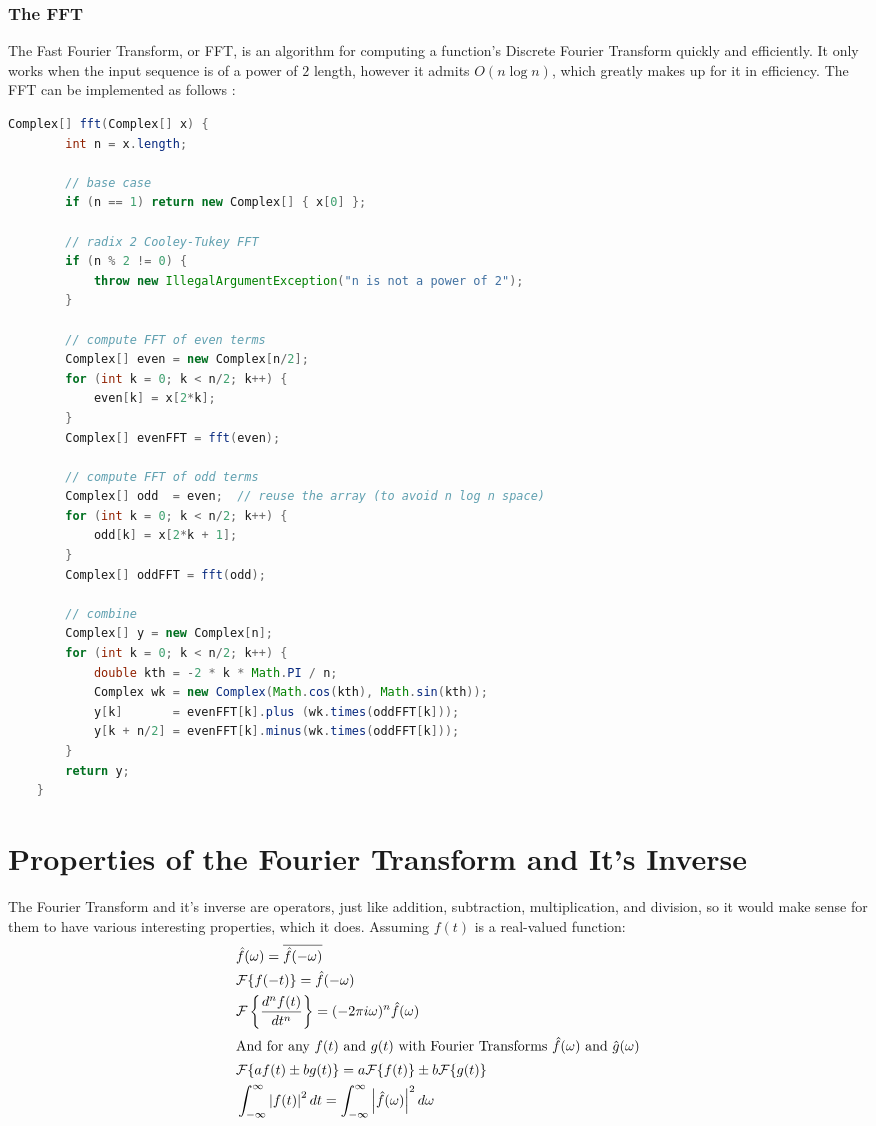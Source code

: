 \documentclass[12pt]{article}
\newcommand{\F}{\mathcal{F}}
\begin{document}
    \subsubsection{The FFT}
    The Fast Fourier Transform, or FFT, is an algorithm for computing a function's Discrete Fourier Transform quickly and efficiently. It only works when the input sequence is of a power of $2$ length, however it admits  $O(n\log n)$, which greatly makes up for it in efficiency. The FFT can be implemented as follows \cite{fft}:
    \begin{lstlisting}[language=Java, basicstyle=\small]
    Complex[] fft(Complex[] x) {
        int n = x.length;

        // base case
        if (n == 1) return new Complex[] { x[0] };

        // radix 2 Cooley-Tukey FFT
        if (n % 2 != 0) {
            throw new IllegalArgumentException("n is not a power of 2");
        }

        // compute FFT of even terms
        Complex[] even = new Complex[n/2];
        for (int k = 0; k < n/2; k++) {
            even[k] = x[2*k];
        }
        Complex[] evenFFT = fft(even);

        // compute FFT of odd terms
        Complex[] odd  = even;  // reuse the array (to avoid n log n space)
        for (int k = 0; k < n/2; k++) {
            odd[k] = x[2*k + 1];
        }
        Complex[] oddFFT = fft(odd);

        // combine
        Complex[] y = new Complex[n];
        for (int k = 0; k < n/2; k++) {
            double kth = -2 * k * Math.PI / n;
            Complex wk = new Complex(Math.cos(kth), Math.sin(kth));
            y[k]       = evenFFT[k].plus (wk.times(oddFFT[k]));
            y[k + n/2] = evenFFT[k].minus(wk.times(oddFFT[k]));
        }
        return y;
    } 
    \end{lstlisting}
    \section{Properties of the Fourier Transform and It's Inverse}
    The Fourier Transform and it's inverse are operators, just like addition, subtraction, multiplication, and division, so it would make sense for them to have various interesting properties, which it does. Assuming $f(t)$ is a real-valued function:
    \begin{align}
        & \hat{f}(\omega) = \overline{\hat{f}(-\omega)} \\
        & \F\{f(-t)\} = \hat{f}(-\omega) \\
        & \F\left\{ \frac{d^nf(t)}{dt^n} \right\} = (-2\pi i \omega)^n\hat{f}(\omega) \\
        \intertext{And for any $f(t)$ and $g(t)$ with Fourier Transforms  $\hat{f}(\omega)$ and $\hat{g}(\omega)$}
        & \F\{af(t)\pm bg(t)\} = a\F\{f(t)\} \pm b\F\{g(t)\} \\
        & \int_{-\infty}^{\infty}\left|f(t)\right|^2dt = \int_{-\infty}^{\infty}\left|\hat{f}(\omega)\right|^2d\omega
    \end{align}
\end{document}
